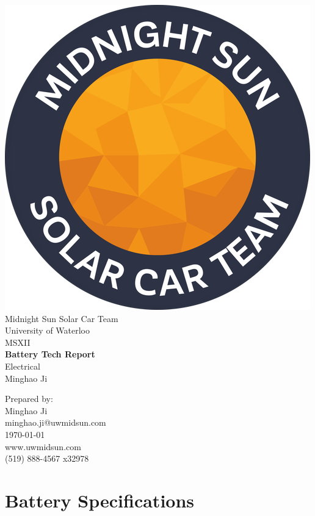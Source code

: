 \documentclass[10pt]{article}
\makeatletter
\newcommand\theteamname{Midnight Sun Solar Car Team} %
\newcommand\theuniversityname{University of Waterloo} %
\newcommand\theteamwebsite{www.uwmidsun.com} %
\newcommand\theteamphone{(519) 888-4567 x32978} %
\newcommand\thetitle{Battery Tech Report} %
\newcommand\thesubtitle{Electrical} %
\newcommand\theauthor{Minghao Ji} %
\newcommand\theauthorcontact{minghao.ji@uwmidsun.com} %
\newcommand\thedate{\today} %
\makeatother
\begin{document}
\begin{titlepage}
\large
\vspace*{2cm}
\centering
\includegraphics[width=.25\textwidth]{./figures/midnightSunLogoCircle.png} \\
\vspace{1.5cm}
{\LARGE \theteamname} \\
\theuniversityname \\
\vspace{2.2cm}
{\LARGE MSXII} \\
\vspace{0.4cm}
{\huge\bfseries \thetitle} \\
\vspace{0.2cm}
{\LARGE \thesubtitle} \\
\vspace{2.2cm}
\ifdefined \theauthor
\par Prepared by: \\
\theauthor \\
\theauthorcontact \\
\fi
\thedate \\
\vfill
\theteamwebsite \\
\theteamphone
\end{titlepage}

\tableofcontents

\section{Battery Specifications}
\end{document}
